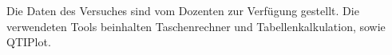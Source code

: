 Die  Daten  des Versuches  sind  vom  Dozenten zur  Verf\"ugung  gestellt. Die
verwendeten  Tools beinhalten  Taschenrechner  und Tabellenkalkulation,  sowie
QTIPlot.
